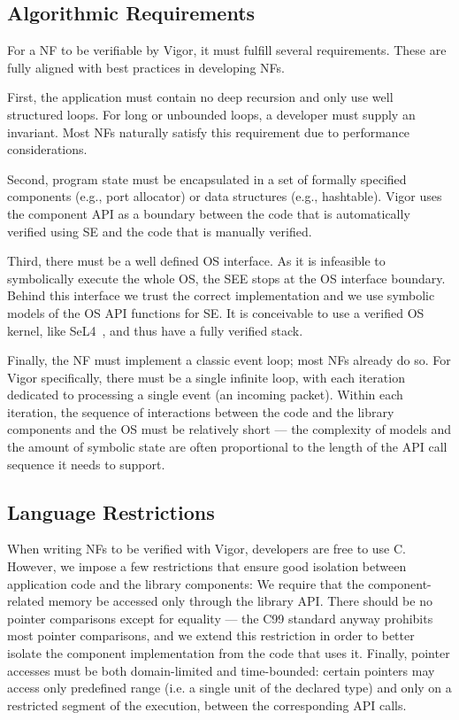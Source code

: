\documentclass[letterpaper,twocolumn,10pt]{article}
\begin{document}
\subsection{Algorithmic Requirements}
\label{sec:algorithmic-requirements}

For a NF to be verifiable by Vigor, it must fulfill several requirements. These are fully aligned with best practices in developing NFs.

First, the application must contain no deep recursion and only use well structured loops. For long or unbounded loops, a developer must supply an invariant. Most NFs naturally satisfy this requirement due to performance considerations.

Second, program state must be encapsulated in a set of formally specified components (e.g., port allocator) or data structures (e.g., hashtable). Vigor uses the component API as a boundary between the code that is automatically verified using SE and the code that is manually verified.%

Third, there must be a well defined OS interface. As it is infeasible to symbolically execute the whole OS, the SEE stops at the OS interface boundary. Behind this interface we trust the correct implementation and we use symbolic models of the OS API functions for SE. It is conceivable to use a verified OS kernel, like SeL4~\cite{klein2009sel4}, and thus have a fully verified stack. 
    
Finally, the NF must implement a classic event loop; most NFs already do so. For Vigor specifically, there must be a single infinite loop, with each iteration dedicated to processing a single event (an incoming packet). Within each iteration, the sequence of interactions between the code and the library components and the OS must be relatively short --- the complexity of models and the amount of symbolic state are often proportional to the length of the API call sequence it needs to support.

\subsection{Language Restrictions}
\label{sec:language-restrictions}

When writing NFs to be verified with Vigor, developers are free to use C. However, we impose a few restrictions that ensure good isolation between application code and the library components: We require that the component-related memory be accessed only through the library API. There should be no pointer comparisons except for equality --- the C99 standard anyway prohibits most pointer comparisons, and we extend this restriction in order to better isolate the component implementation from the code that uses it. Finally, pointer accesses must be both domain-limited and time-bounded: certain pointers may access only predefined range (i.e. a single unit of the declared type) and only on a restricted segment of the execution, between the corresponding API calls.
    
\end{document}
